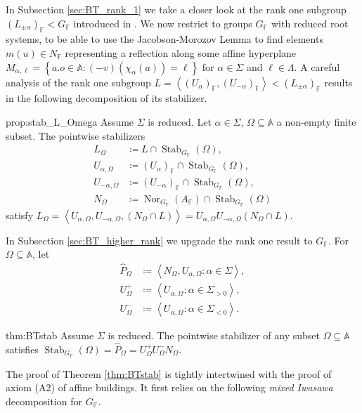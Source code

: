 \documentclass[12pt]{amsart}
\newcommand{\F}{\mathbb{F} }
\newcommand{\A}{\mathbb{A}}
\numberwithin{equation}{section}
\theoremstyle{remark} %
\begin{document}
In Subsection \ref{sec:BT_rank_1} we take a closer look at the rank one subgroup $(L_{\pm \alpha})_\F < G_\F$ introduced in \cite[Section \ref{I-sec:rank1}]{AppAGRCF}. We now restrict to groups $G_\F$ with reduced root systems, to be able to use the Jacobson-Morozov Lemma to find elements $m(u)\in N_\F$ representing a reflection along some affine hyperplane $M_{\alpha, \ell} = \left\{ a.o \in \A \colon (-v)(\chi_\alpha(a)) = \ell \right\}$ for $\alpha \in \Sigma$ and $\ell \in \Lambda$. A careful analysis of the rank one subgroup $L = \left\langle  (U_\alpha)_\F, (U_{-\alpha})_\F \right\rangle < (L_{\pm \alpha})_\F$ results in the following decomposition of its stabilizer.

	\begin{repproposition}{prop:stab_L_Omega} Assume $\Sigma$ is reduced. Let $\alpha \in \Sigma$, $\Omega \subseteq \A$ a non-empty finite subset. The pointwise stabilizers
		\begin{align*}
			L_\Omega &\coloneq L \cap \operatorname{Stab}_{G_\F}(\Omega), \\
			U_{\alpha,\Omega} &\coloneq (U_\alpha)_\F \cap \operatorname{Stab}_{G_\F}(\Omega), \\
			U_{-\alpha, \Omega} &\coloneq (U_{-\alpha})_\F \cap \operatorname{Stab}_{G_\F}(\Omega), \\
			N_\Omega &\coloneq \operatorname{Nor}_{G_\F}(A_\F) \cap \operatorname{Stab}_{G_\F}(\Omega)
		\end{align*}
	satisfy $L_\Omega = \left\langle U_{\alpha,\Omega}, U_{-\alpha, \Omega} , (N_\Omega \cap L) \right\rangle = U_{\alpha,\Omega} U_{-\alpha, \Omega}(N_\Omega \cap L)$.
\end{repproposition}
In Subsection \ref{sec:BT_higher_rank} we upgrade the rank one result to $G_\F$. For $\Omega \subseteq \A$, let
\begin{align*}
	\hat{P}_{\Omega} &\coloneq \left\langle N_\Omega, U_{\alpha, \Omega} \colon \alpha \in \Sigma \right\rangle, \\
	U_\Omega^+ &\coloneq \left\langle U_{\alpha,\Omega} \colon \alpha \in \Sigma_{>0}\right\rangle, \\
	U_{\Omega}^-&\coloneq \left\langle U_{\alpha,\Omega} \colon \alpha \in \Sigma_{<0} \right\rangle.
\end{align*}
\begin{reptheorem}{thm:BTstab}
	Assume $\Sigma$ is reduced. The pointwise stabilizer of any subset $\Omega \subseteq \A$ satisfies
	$
	\operatorname{Stab}_{G_\F}(\Omega) = \hat{P}_\Omega = U_\Omega^+ U_{\Omega}^- N_{\Omega} .
	$
\end{reptheorem}
The proof of Theorem \ref{thm:BTstab} is tightly intertwined with the proof of axiom (A2) of affine buildings. It first relies on the following \emph{mixed Iwasawa} decomposition for $G_\F$. 
\end{document}
